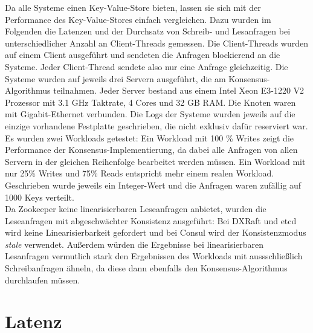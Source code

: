 Da alle Systeme einen Key-Value-Store bieten, lassen sie sich mit der Performance des Key-Value-Stores einfach vergleichen. Dazu wurden im Folgenden die Latenzen und der Durchsatz von Schreib- und Lesanfragen bei unterschiedlicher Anzahl an Client-Threads gemessen. Die Client-Threads wurden auf einem Client ausgeführt und sendeten die Anfragen blockierend an die Systeme. Jeder Client-Thread sendete also nur eine Anfrage gleichzeitig. Die Systeme wurden auf jeweils drei Servern ausgeführt, die am Konsensus-Algorithmus teilnahmen. Jeder Server bestand aus einem Intel Xeon E3-1220 V2 Prozessor mit 3.1 GHz Taktrate, 4 Cores und 32 GB RAM. Die Knoten waren mit Gigabit-Ethernet verbunden. Die Logs der Systeme wurden jeweils auf die einzige vorhandene Festplatte geschrieben, die nicht exklusiv dafür reserviert war. \\
Es wurden zwei Workloads getestet: Ein Workload mit 100 \% Writes zeigt die Performance der Konsensus-Implementierung, da dabei alle Anfragen von allen Servern in der gleichen Reihenfolge bearbeitet werden müssen. Ein Workload mit nur 25\% Writes und 75\% Reads entspricht mehr einem realen Workload. Geschrieben wurde jeweils ein Integer-Wert und die Anfragen waren zufällig auf 1000 Keys verteilt. \\
Da Zookeeper keine linearisierbaren Leseanfragen anbietet, wurden die Leseanfragen mit abgeschwächter Konsistenz ausgeführt: Bei DXRaft und etcd wird keine Linearisierbarkeit gefordert und bei Consul wird der Konsistenzmodus \textit{stale} verwendet. Außerdem würden die Ergebnisse bei linearisierbaren Lesanfragen vermutlich stark den Ergebnissen des Workloads mit aussschließlich Schreibanfragen ähneln, da diese dann ebenfalls den Konsensus\hyp{}Algorithmus durchlaufen müssen.

\section{Latenz}
\label{latency}

